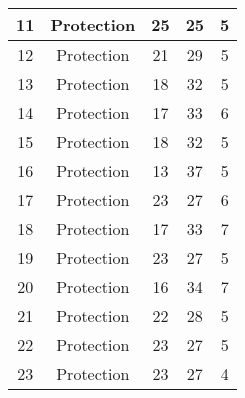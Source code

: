 \documentclass[results.tex]{subfiles}
\begin{document}
\begin{center}
\begin{tabular}{| c || c | c | c | c |}
            \hline
            11                      & Protection                   & 25                     & 25                      & 5                    \\
            \hline
            12                      & Protection                   & 21                     & 29                      & 5                    \\
            \hline
            13                      & Protection                   & 18                     & 32                      & 5                    \\
            \hline
            14                      & Protection                   & 17                     & 33                      & 6                    \\
            \hline
            15                      & Protection                   & 18                     & 32                      & 5                    \\
            \hline
            16                      & Protection                   & 13                     & 37                      & 5                    \\
            \hline
            17                      & Protection                   & 23                     & 27                      & 6                    \\
            \hline
            18                      & Protection                   & 17                     & 33                      & 7                    \\
            \hline
            19                      & Protection                   & 23                     & 27                      & 5                    \\
            \hline
            20                      & Protection                   & 16                     & 34                      & 7                    \\
            \hline
            21                      & Protection                   & 22                     & 28                      & 5                    \\
            \hline
            22                      & Protection                   & 23                     & 27                      & 5                    \\
            \hline
            23                      & Protection                   & 23                     & 27                      & 4                    \\

\end{tabular}
\end{center}
\end{document}
